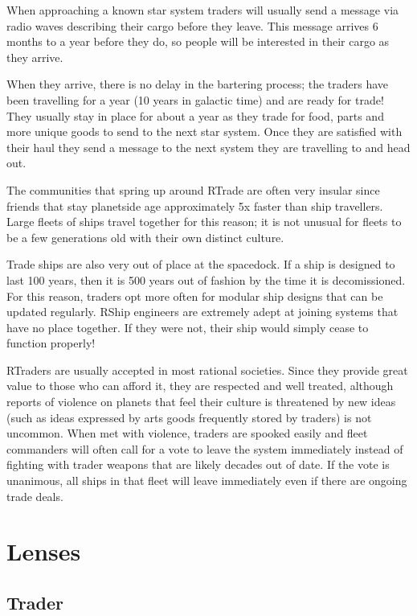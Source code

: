 \documentclass[a4paper,twocolumn]{memoir}
\begin{document}
When approaching a known star system traders will usually send a message via
radio waves describing their cargo before they leave. This message arrives 6
months to a year before they do, so people will be interested in their cargo as
they arrive.

% 
When they arrive, there is no delay in the bartering process; the traders have
been travelling for a year (10 years in galactic time) and are ready for trade!
They usually stay in place for about a year as they trade for food, parts and
more unique goods to send to the next star system. Once they are satisfied with
their haul they send a message to the next system they are travelling to and
head out.


The communities that spring up around RTrade are often very insular since
friends that stay planetside age approximately 5x faster than ship travellers.
Large fleets of ships travel together for this reason; it is not unusual for
fleets to be a few generations old with their own distinct culture.

Trade ships are also very out of place at the spacedock. If a ship is designed
to last 100 years, then it is 500 years out of fashion by the time it is
decomissioned. For this reason, traders opt more often for modular ship designs
that can be updated regularly. RShip engineers are extremely adept at joining
systems that have no place together. If they were not, their ship would simply
cease to function properly!


RTraders are usually accepted in most rational societies. Since they provide
great value to those who can afford it, they are respected and well treated,
although reports of violence on planets that feel their culture is threatened by
new ideas (such as ideas expressed by arts goods frequently stored by traders)
is not uncommon. When met with violence, traders are spooked easily and fleet
commanders will often call for a vote to leave the system immediately instead of
fighting with trader weapons that are likely decades out of date. If the vote is
unanimous, all ships in that fleet will leave immediately even if there are
ongoing trade deals.


\section{Lenses}
\label{sec:lenses}

\subsection{Trader}
\label{sec:trader}

\begin{character}
\end{character}
\end{document}
